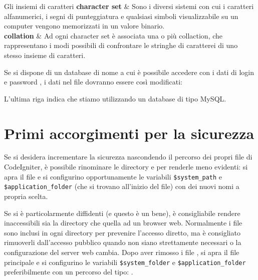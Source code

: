 \begin{deftabg}{Gli insiemi di caratteri}
\textbf{character set} & Sono i diversi sistemi con cui i caratteri alfanumerici, i segni di punteggiatura e qualsiasi simboli visualizzabile su un computer vengono memorizzati in un valore binario. \\
\midrule
\textbf{collation} & Ad ogni character set è associata una o più collaction, che rappresentano i modi possibili di confrontare le stringhe di caratterei di uno stesso insieme di caratteri. \\
\end{deftabg}

Se si dispone di un database di nome  a cui è possibile accedere con i dati di login  e password , i dati nel file  dovranno essere così modificati:


L'ultima riga indica che stiamo utilizzando un database di tipo MySQL. 

\section{Primi accorgimenti per la sicurezza}
Se si desidera incrementare la sicurezza nascondendo il percorso dei propri file di CodeIgniter, è possibile rinominare le directory  e  per renderle meno evidenti: si apra il file  e si configurino opportunamente le variabili \verb|$system_path| e \verb|$application_folder| (che si trovano all'inizio del file) con dei nuovi nomi a propria scelta.

Se si è particolarmente diffidenti (e questo è un bene), è consigliabile rendere inaccessibili sia la directory  che quella  ad un browser web. Normalmente i file  sono inclusi in ogni directory per prevenire l'accesso diretto, ma è consigliato rimuoverli dall'accesso pubblico quando non siano strettamente necessari o la configurazione del server web cambia. Dopo aver rimosso i file , si apra il file  principale e si configurino le variabili \verb|$system_folder| e \verb|$application_folder| preferibilmente con un percorso del tipo: . 


